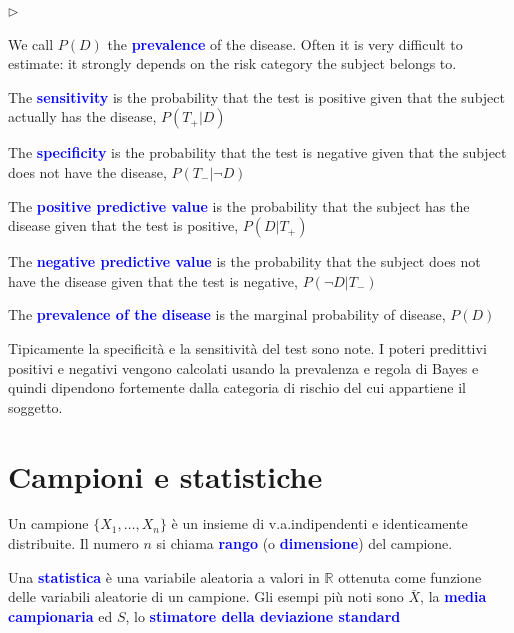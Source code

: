 \documentclass[10pt,openany]{book}
\def\RR{\mathds R}
\newcommand{\mylabel}[1]{{\footnotesize\textsf{#1}}\hfill}
\renewenvironment{itemize}
  {\begin{list}{$\triangleright$}{%
   \setlength{\parskip}{0mm}
   \setlength{\topsep}{.2\baselineskip}
   \setlength{\rightmargin}{0mm}
   \setlength{\listparindent}{0mm}
   \setlength{\itemindent}{0mm}
   \setlength{\labelwidth}{3ex}
   \setlength{\itemsep}{.4\baselineskip}
   \setlength{\parsep}{0mm}
   \setlength{\partopsep}{0mm}
   \setlength{\labelsep}{1ex}
   \setlength{\leftmargin}{\labelwidth+\labelsep}
   \let\makelabel\mylabel}}{%
   \end{list}\vspace*{-1.3mm}}
\def\emph#1{\textcolor{blue}{\textbf{\boldmath #1}}}
\theoremstyle{mio}
\theoremstyle{liscio}
\begin{document}
\begin{itemize}
\item We call $P(D)$ the \emph{prevalence\/} of the disease. Often it is very difficult to estimate: it strongly depends on the risk category the subject belongs to.
\item The \emph{sensitivity\/} is the probability that the test is
positive given that the subject actually has the disease, $P(T_+ | D)$
\item The \emph{specificity\/} is the probability that the test is
negative given that the subject does not have the disease, $P(T_- | \neg D)$
\item The \emph{positive predictive value\/} is the probability that the subject has the
disease given that the test is positive, $P(D | T_+)$
\item The \emph{negative predictive value\/} is the probability that the subject does not have
the disease given that the test is negative, $P(\neg D | T_-)$
\item The \emph{prevalence of the disease\/} is the marginal probability of disease, $P(D)$

\end{itemize}


Tipicamente la specificità e la sensitività del test sono note. I poteri predittivi positivi e negativi vengono calcolati usando la prevalenza e regola di Bayes e quindi dipendono fortemente dalla categoria di rischio del cui appartiene il soggetto.





\clearpage\section{Campioni e statistiche}

Un campione $\{X_1,\dots,X_n\}$ è un insieme di v.a.\@ indipendenti e identicamente distribuite. Il numero $n$ si chiama \emph{rango\/} (o \emph{dimensione\/}) del campione. 

Una \emph{statistica\/} è una variabile aleatoria a valori in $\RR$ ottenuta come funzione delle variabili aleatorie di un campione. Gli esempi più noti sono $\bar X$, la \emph{media campionaria\/} ed $S$, lo \emph{stimatore della deviazione standard\/} 

\ceq{\hfill \emph{$\bar X$}}{=}{\frac1n\sum_{i=1}^n X_i}

\ceq{\hfill  \emph{$S$}}{=}{\sqrt{\frac1{n-1}\sum_{i=1}^n (X_i-\bar X)^2}}
 
\end{document}
